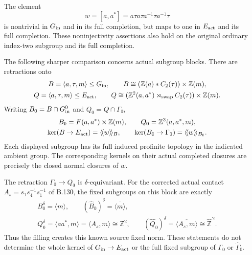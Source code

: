 The element
\begin{equation}\label{eq:B135-killed-word}
 w=[a,a^*]=a\tau a\tau a^{-1}\tau a^{-1}\tau
\end{equation}
is nontrivial in $G_{\rm in}$ and in its full completion, but
maps to one in $E_{\rm act}$ and its full completion. These
noninjectivity assertions also hold on the original ordinary
index-two subgroup and its full completion.

The following sharper comparison concerns actual subgroup blocks.
There are retractions onto
\begin{equation}\label{eq:B135-blocks}
 \begin{gathered}
 B=\langle a,\tau,m\rangle\leq G_{\rm in},\qquad
 B\cong(\mathbb Z(a)*C_2(\tau))\times\mathbb Z(m),\\
 Q=\langle a,\tau,m\rangle\leq E_{\rm act},\qquad
 Q\cong(\mathbb Z^2(a,a^*)\rtimes_{\rm swap}C_2(\tau))
                  \times\mathbb Z(m).
 \end{gathered}
\end{equation}
Writing $B_0=B\cap G_{\rm in}^0$ and $Q_0=Q\cap\Gamma_0$,
\begin{equation}\label{eq:B135-block-kernels}
 \begin{gathered}
 B_0=F(a,a^*)\times\mathbb Z(m),\qquad Q_0=\mathbb Z^3(a,a^*,m),\\
 \ker(B\to E_{\rm act})=\langle\!\langle w\rangle\!\rangle_B,
 \qquad
 \ker(B_0\to\Gamma_0)=\langle\!\langle w\rangle\!\rangle_{B_0}.
 \end{gathered}
\end{equation}
Each displayed subgroup has its full induced profinite topology
in the indicated ambient group. The corresponding kernels on
their actual completed closures are precisely the closed normal
closures of $w$.

The retraction $\Gamma_0\to Q_0$ is $\delta$-equivariant.
For the corrected actual contact
$A_s=s_1s_4^{-1}s_1^{-1}$ of B.130, the fixed subgroups on this
block are exactly
\begin{equation}\label{eq:B135-fixed-creation}
 \begin{gathered}
 B_0^\delta=\langle m\rangle,\qquad
 (\widehat B_0)^\delta=\overline{\langle m\rangle},\\
 Q_0^\delta=\langle aa^*,m\rangle
             =\langle A_s,m\rangle\cong\mathbb Z^2,\qquad
 (\widehat Q_0)^\delta
             =\overline{\langle A_s,m\rangle}\cong\widehat{\mathbb Z}^{\,2}.
 \end{gathered}
\end{equation}
Thus the filling creates this known source fixed norm. These
statements do not determine the whole kernel of
$G_{\rm in}\to E_{\rm act}$ or the full fixed subgroup of
$\Gamma_0$ or $\widehat\Gamma_0$.

